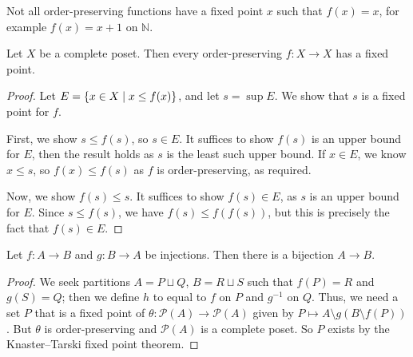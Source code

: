 Not all order-preserving functions have a fixed point \( x \) such that \( f(x) = x \), for example \( f(x) = x + 1 \) on \( \mathbb N \).
\begin{theorem}
    Let \( X \) be a complete poset.
    Then every order-preserving \( f \colon X \to X \) has a fixed point.
\end{theorem}
\begin{proof}
    Let \( E = \qty{x \in X \mid x \leq f(x)} \), and let \( s = \sup E \).
    We show that \( s \) is a fixed point for \( f \).

    First, we show \( s \leq f(s) \), so \( s \in E \).
    It suffices to show \( f(s) \) is an upper bound for \( E \), then the result holds as \( s \) is the least such upper bound.
    If \( x \in E \), we know \( x \leq s \), so \( f(x) \leq f(s) \) as \( f \) is order-preserving, as required.

    Now, we show \( f(s) \leq s \).
    It suffices to show \( f(s) \in E \), as \( s \) is an upper bound for \( E \).
    Since \( s \leq f(s) \), we have \( f(s) \leq f(f(s)) \), but this is precisely the fact that \( f(s) \in E \).
\end{proof}
\begin{corollary}
    Let \( f \colon A \to B \) and \( g \colon B \to A \) be injections.
    Then there is a bijection \( A \to B \).
\end{corollary}
\begin{proof}
    We seek partitions \( A = P \sqcup Q \), \( B = R \sqcup S \) such that \( f(P) = R \) and \( g(S) = Q \); then we define \( h \) to equal to \( f \) on \( P \) and \( g^{-1} \) on \( Q \).
    Thus, we need a set \( P \) that is a fixed point of \( \theta \colon \mathcal P(A) \to \mathcal P(A) \) given by \( P \mapsto A \setminus g(B \setminus f(P)) \).
    But \( \theta \) is order-preserving and \( \mathcal P(A) \) is a complete poset.
    So \( P \) exists by the Knaster--Tarski fixed point theorem.
\end{proof}


